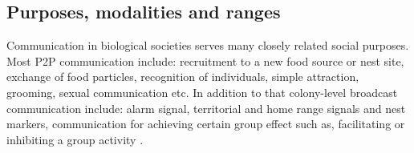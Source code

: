 \documentclass{intech}
\begin{document}
\subsection{Purposes, modalities and ranges}
Communication in biological societies serves many closely related social purposes. Most P2P communication include: recruitment to a new food source or nest site, exchange of food particles, recognition of individuals, simple attraction, grooming, sexual communication etc. In addition to that colony-level broadcast communication include: alarm signal, territorial and home range signals and nest markers, communication for achieving certain group effect such as, facilitating or inhibiting  a group activity \citep{Holldobler1990}.
\end{document}
